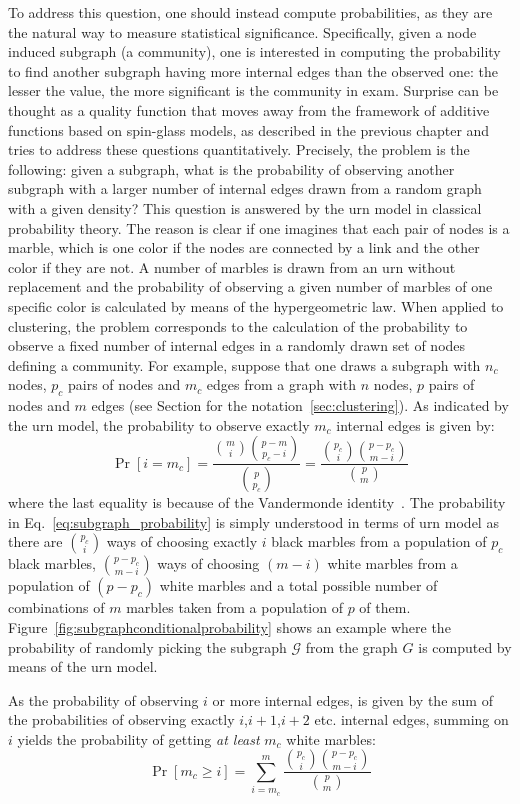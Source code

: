 To address this question, one should instead compute probabilities, as they are the natural way to measure statistical significance.
Specifically, given a node induced subgraph (a community), one is interested in computing the probability to find another subgraph having more internal edges than the observed one: the lesser the value, the more significant is the community in exam. Surprise can be thought as a quality function that moves away from the framework of additive functions based on spin-glass models, as described in the previous chapter and tries to address these questions quantitatively.
Precisely, the problem is the following: given a subgraph, what is the probability of observing another subgraph with a larger number of internal edges drawn from a random graph with a given density?
This question is answered by the urn model in classical probability theory. The reason is clear if one imagines that each pair of nodes is a marble, which is one color if the nodes are connected by a link and the other color if they are not.
A number of marbles is drawn from an urn without replacement and the probability of observing a given number of marbles of one specific color is calculated by means of the hypergeometric law.
When applied to clustering, the problem corresponds to the calculation of the probability to observe a fixed number of internal edges in a randomly drawn set of nodes defining a community.
For example, suppose that one draws a subgraph with $n_c$ nodes, $p_c$ pairs of nodes and $m_c$ edges from a graph with $n$ nodes, $p$ pairs of nodes and $m$ edges (see Section for the notation~\ref{sec:clustering}).
As indicated by the urn model, the probability to observe exactly $m_c$ internal edges is given by:
\begin{equation}\label{eq:subgraph_probability}
\Pr[i=m_c] = \frac{\binom{m}{i}\binom{p-m}{p_c-i} }{\binom{p}{p_c}} = \frac{\binom{p_c}{i} \binom{p-p_c}{m-i}}{\binom{p}{m}}
\end{equation}
where the last equality is because of the Vandermonde identity~\cite{feller1968}.
The probability in Eq.~\ref{eq:subgraph_probability} is simply understood in terms of urn model as there are $\binom{p_c}{i}$ ways of choosing exactly $i$ black marbles from a population of $p_c$ black marbles, $\binom{p-p_c}{m-i}$ ways of choosing $(m-i)$ white marbles from a population of $(p-p_c)$ white marbles and a total possible number of combinations of $m$ marbles taken from a population of $p$ of them. Figure~\ref{fig:subgraphconditionalprobability} shows an example where the probability of randomly picking the subgraph $\mathcal{G}$ from the graph $G$ is computed by means of the urn model.

As the probability of observing $i$ or more internal edges, is given by the sum of the probabilities of observing exactly $i$,$i+1$,$i+2$ etc. internal edges, summing on $i$ yields the probability of getting \emph{at least} $m_c$ white marbles:
\begin{equation}\label{eq:subgraph_probability_marginalized}
\Pr[ m_c \geq i ] = \sum\limits_{i=m_c}^{m} \frac{\binom{p_c}{i} \binom{p-p_c}{m-i}}{\binom{p}{m}}
\end{equation}

